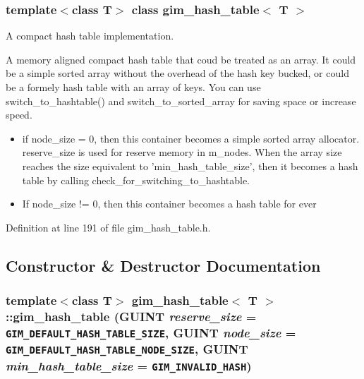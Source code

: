 \subsubsection*{template$<$class T$>$ class gim\_\-hash\_\-table$<$ T $>$}

A compact hash table implementation. 

A memory aligned compact hash table that coud be treated as an array. It could be a simple sorted array without the overhead of the hash key bucked, or could be a formely hash table with an array of keys. You can use switch\_\-to\_\-hashtable() and switch\_\-to\_\-sorted\_\-array for saving space or increase speed. 

\begin{itemize}
\item if node\_\-size = 0, then this container becomes a simple sorted array allocator. reserve\_\-size is used for reserve memory in m\_\-nodes. When the array size reaches the size equivalent to 'min\_\-hash\_\-table\_\-size', then it becomes a hash table by calling check\_\-for\_\-switching\_\-to\_\-hashtable. \item If node\_\-size != 0, then this container becomes a hash table for ever \end{itemize}


Definition at line 191 of file gim\_\-hash\_\-table.h.

\subsection{Constructor \& Destructor Documentation}
\hypertarget{classgim__hash__table_efe21c907c69c8077ec0886aaa778f6f}{
\subsubsection[gim\_\-hash\_\-table]{\setlength{\rightskip}{0pt plus 5cm}template$<$class T$>$ {\bf gim\_\-hash\_\-table}$<$ T $>$::{\bf gim\_\-hash\_\-table} (GUINT {\em reserve\_\-size} = {\tt GIM\_\-DEFAULT\_\-HASH\_\-TABLE\_\-SIZE}, \/  GUINT {\em node\_\-size} = {\tt GIM\_\-DEFAULT\_\-HASH\_\-TABLE\_\-NODE\_\-SIZE}, \/  GUINT {\em min\_\-hash\_\-table\_\-size} = {\tt GIM\_\-INVALID\_\-HASH})}}
\label{classgim__hash__table_efe21c907c69c8077ec0886aaa778f6f}


